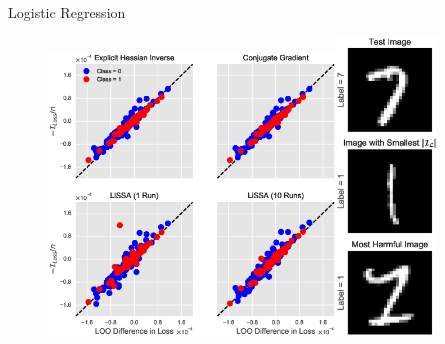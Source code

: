 \documentclass[blue]{beamer}
\newenvironment{figure*}%
{\begin{figure}}
{\end{figure}}
\begin{document}
\begin{frame}{Logistic Regression}

\begin{figure}
\vskip 0.0in
\begin{center}
\centerline{\includegraphics[width=3in]{fig-logit}\includegraphics[width=1.05in]{fig-logit-img}}
\vskip -0.1in
\label{logit_examples}
\end{center}
\vskip -0.25in
\end{figure} 

\end{frame}
\end{document}
